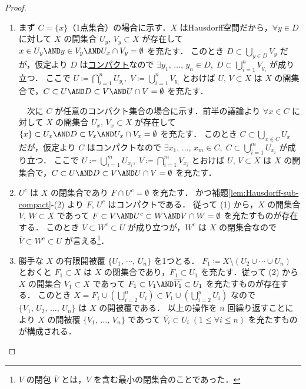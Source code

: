 \documentclass[algtopo_main]{subfiles}
\begin{document}
\begin{proof}
    \begin{enumerate}
        \item まず $C = \{x\}$（1点集合）の場合に示す．$X$ はHausdorff空間だから，$\forall y \in D$ に対して $X$ の開集合 $U_y,\, V_y \subset X$ が存在して $x \in U_y \AND y \in V_y \AND U_x \cap V_y = \emptyset$ を充たす．
        このとき $D \subset \bigcup_{y \in D} V_y$ だが，仮定より $D$ は\hyperref[def:compact]{コンパクト}なので $\exists y_1,\, \dots ,\, y_n \in D,\; D \subset \bigcup_{i=1}^n V_{y_i}$ が成り立つ．
        ここで $U \coloneqq \bigcap_{i=1}^n U_{y_i},\; V \coloneqq \bigcup_{i=1}^n V_{y_i}$ とおけば $U,\, V \subset X$ は $X$ の開集合で，$C \subset U \AND D \subset V \AND U \cap V = \emptyset$ を充たす．

        　次に $C$ が任意のコンパクト集合の場合に示す．前半の議論より $\forall x \in C$ に対して $X$ の開集合 $U_x,\, V_x \subset X$ が存在して $\{x\} \subset U_x \AND D \subset V_x \AND U_x \cap V_x = \emptyset$ を充たす．
        このとき $C \subset \bigcup_{x \in C} U_x$ だが，仮定より $C$ はコンパクトなので $\exists x_1,\, \dots ,\, x_m \in C,\; C \subset \bigcup_{i=1}^m U_{x_i}$ が成り立つ．
        ここで $U \coloneqq \bigcup_{i=1}^m U_{x_i},\; V \coloneqq \bigcap_{i=1}^m V_{x_i}$ とおけば $U,\, V \subset X$ は $X$ の開集合で，$C \subset U \AND D \subset V \AND U \cap V = \emptyset$ を充たす．
        \item $U^c$ は $X$ の閉集合であり $F \cap U^c = \emptyset$ を充たす．
        かつ補題\ref{lem:Hausdorff-sub-compact}-(2) より $F,\, U^c$ はコンパクトである．
        従って (1) から，$X$ の開集合 $V,\, W \subset X$ であって $F \subset V \AND U^c \subset W \AND V \cap W = \emptyset$ を充たすものが存在する．
        このとき $V  \subset W^c \subset U$ が成り立つが，$W^c$ は $X$ の閉集合なので $\overline{V} \subset W^c \subset U$ が言える\footnote{$V$ の閉包 $\overline{V}$ とは，$V$ を含む最小の閉集合のことであった．}．

        \item 勝手な $X$ の有限開被覆 $\{U_1,\, \cdots ,\, U_n\}$ を1つとる． 
        $F_1 \coloneqq X \setminus (U_2 \cup \cdots \cup U_n)$ とおくと $F_1 \subset X$ は $X$ の閉集合であり，$F_1 \subset U_1$ を充たす．従って (2) から $X$ の開集合 $V_1 \subset X$ であって $F_1 \subset V_1 \AND \overline{V_1} \subset U_1$ を充たすものが存在する．
        このとき $X = F_1 \cup \left( \bigcup_{i=2}^n U_i \right) \subset V_1 \cup\left( \bigcup_{i=2}^n U_i \right)$ なので $\{V_1,\, U_2,\, \dots ,\, U_n\}$ は $X$ の開被覆である．
        以上の操作を $n$ 回繰り返すことにより $X$ の開被覆 $\{V_1,\, \dots ,\, V_n\}$ であって $\overline{V_i} \subset U_i\; (1 \le \forall i \le n)$ を充たすものが構成される．
    \end{enumerate}
    
\end{proof}
\end{document}

